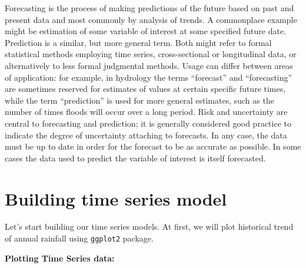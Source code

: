 \documentclass[12pt,openany]{book}
\newenvironment{Shaded}{\begin{snugshade}}{\end{snugshade}}
\newcommand{\DataTypeTok}[1]{\textcolor[rgb]{0.13,0.29,0.53}{#1}}
\newcommand{\DecValTok}[1]{\textcolor[rgb]{0.00,0.00,0.81}{#1}}
\newcommand{\FloatTok}[1]{\textcolor[rgb]{0.00,0.00,0.81}{#1}}
\newcommand{\KeywordTok}[1]{\textcolor[rgb]{0.13,0.29,0.53}{\textbf{#1}}}
\newcommand{\NormalTok}[1]{#1}
\newcommand{\OperatorTok}[1]{\textcolor[rgb]{0.81,0.36,0.00}{\textbf{#1}}}
\newcommand{\StringTok}[1]{\textcolor[rgb]{0.31,0.60,0.02}{#1}}
\begin{document}
Forecasting is the process of making predictions of the future based on past and present data and most commonly by analysis of trends. A commonplace example might be estimation of some variable of interest at some specified future date. Prediction is a similar, but more general term. Both might refer to formal statistical methods employing time series, cross-sectional or longitudinal data, or alternatively to less formal judgmental methods. Usage can differ between areas of application: for example, in hydrology the terms ``forecast'' and ``forecasting'' are sometimes reserved for estimates of values at certain specific future times, while the term ``prediction'' is used for more general estimates, such as the number of times floods will occur over a long period. Risk and uncertainty are central to forecasting and prediction; it is generally considered good practice to indicate the degree of uncertainty attaching to forecasts. In any case, the data must be up to date in order for the forecast to be as accurate as possible. In some cases the data used to predict the variable of interest is itself forecasted.

\hypertarget{building-time-series-model}{%
\section{Building time series model}\label{building-time-series-model}}

Let's start building our time series models. At first, we will plot historical trend of annual rainfall using \texttt{ggplot2} package.

\textbf{Plotting Time Series data:}

\begin{Shaded}
\end{Shaded}
\end{document}
